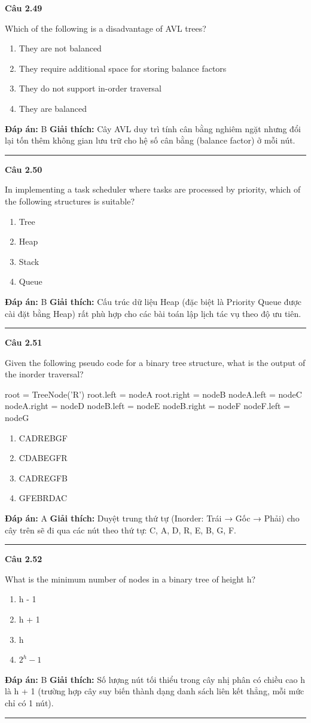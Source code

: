\documentclass[11pt,a4paper]{article}
\newenvironment{question}[1]{%
  \par\vspace{1em}\noindent\textbf{\large Câu #1}\par\vspace{0.4em}
}{%
  \par\vspace{1em}\hrule\vspace{0.6em}
}
\newenvironment{choices}{%
  \begin{enumerate}[label=\textbf{\Alph*.},leftmargin=2.2em,itemsep=2pt,topsep=3pt]
}{%
  \end{enumerate}
}
\newcommand{\choice}{\item}
\newenvironment{codebox}{%
  \begin{tcolorbox}[colback=gray!8!white,colframe=gray!50!black,arc=1.5mm,boxrule=0.6pt,left=3mm,right=3mm,top=2.5mm,bottom=2.5mm]
  \ttfamily\small
}{%
  \end{tcolorbox}
}
\begin{document}
\begin{question}{2.49}
Which of the following is a disadvantage of AVL trees?
\begin{choices}
\choice They are not balanced
\choice They require additional space for storing balance factors
\choice They do not support in-order traversal
\choice They are balanced
\end{choices}
\textbf{Đáp án:} B
\textbf{Giải thích:} Cây AVL duy trì tính cân bằng nghiêm ngặt nhưng đổi lại tốn thêm không gian lưu trữ cho hệ số cân bằng (balance factor) ở mỗi nút.
\end{question}

\begin{question}{2.50}
In implementing a task scheduler where tasks are processed by priority, which of the following structures is suitable?
\begin{choices}
\choice Tree
\choice Heap
\choice Stack
\choice Queue
\end{choices}
\textbf{Đáp án:} B
\textbf{Giải thích:} Cấu trúc dữ liệu Heap (đặc biệt là Priority Queue được cài đặt bằng Heap) rất phù hợp cho các bài toán lập lịch tác vụ theo độ ưu tiên.
\end{question}

\begin{question}{2.51}
Given the following pseudo code for a binary tree structure, what is the output of the inorder traversal?
\begin{codebox}
root = TreeNode('R')
root.left = nodeA
root.right = nodeB
nodeA.left = nodeC
nodeA.right = nodeD
nodeB.left = nodeE
nodeB.right = nodeF
nodeF.left = nodeG
\end{codebox}
\begin{choices}
\choice CADREBGF
\choice CDABEGFR
\choice CADREGFB
\choice GFEBRDAC
\end{choices}
\textbf{Đáp án:} A
\textbf{Giải thích:} Duyệt trung thứ tự (Inorder: Trái → Gốc → Phải) cho cây trên sẽ đi qua các nút theo thứ tự: C, A, D, R, E, B, G, F.
\end{question}

\begin{question}{2.52}
What is the minimum number of nodes in a binary tree of height h?
\begin{choices}
\choice h - 1
\choice h + 1
\choice h
\choice $2^h - 1$
\end{choices}
\textbf{Đáp án:} B
\textbf{Giải thích:} Số lượng nút tối thiểu trong cây nhị phân có chiều cao h là h + 1 (trường hợp cây suy biến thành dạng danh sách liên kết thẳng, mỗi mức chỉ có 1 nút).
\end{question}
\end{document}
